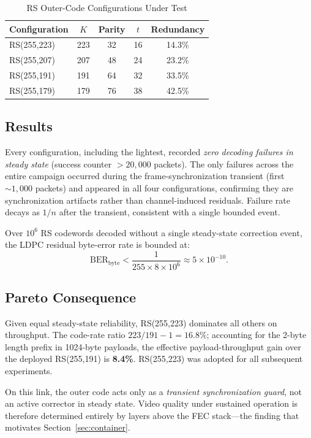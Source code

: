 \documentclass[conference]{IEEEtran}
\begin{document}
\begin{table}[t]
  \centering
  \caption{RS Outer-Code Configurations Under Test}
  \label{tab:rs}
  \begin{tabular}{lcccc}
    \toprule
    Configuration & $K$ & Parity & $t$ & Redundancy \\
    \midrule
    RS(255,223) & 223 & 32 & 16 & 14.3\% \\
    RS(255,207) & 207 & 48 & 24 & 23.2\% \\
    RS(255,191) & 191 & 64 & 32 & 33.5\% \\
    RS(255,179) & 179 & 76 & 38 & 42.5\% \\
    \bottomrule
  \end{tabular}
\end{table}

\subsection{Results}

Every configuration, including the lightest, recorded \emph{zero decoding failures in steady state} (success counter $>20{,}000$ packets). The only failures across the entire campaign occurred during the frame-synchronization transient (first $\sim\!1{,}000$ packets) and appeared in all four configurations, confirming they are synchronization artifacts rather than channel-induced residuals. Failure rate decays as $1/n$ after the transient, consistent with a single bounded event.

Over $10^6$ RS codewords decoded without a single steady-state correction event, the LDPC residual byte-error rate is bounded at:
\begin{equation}
  \text{BER}_\text{byte} < \frac{1}{255 \times 8 \times 10^6} \approx 5\times10^{-10}.
  \label{eq:ber_bound}
\end{equation}

\subsection{Pareto Consequence}

Given equal steady-state reliability, RS(255,223) dominates all others on throughput. The code-rate ratio $223/191 - 1 = 16.8\%$; accounting for the 2-byte length prefix in 1024-byte payloads, the effective payload-throughput gain over the deployed RS(255,191) is \textbf{8.4\%}. RS(255,223) was adopted for all subsequent experiments.

On this link, the outer code acts only as a \emph{transient synchronization guard}, not an active corrector in steady state. Video quality under sustained operation is therefore determined entirely by layers above the FEC stack---the finding that motivates Section~\ref{sec:container}.
\end{document}
